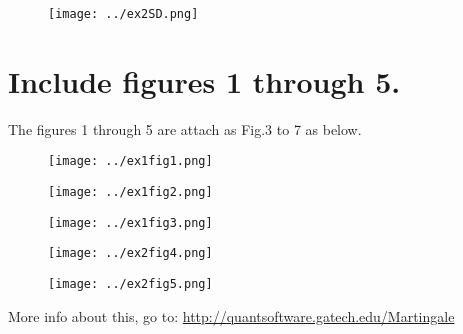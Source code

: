 \documentclass{svproc}
\begin{document}
\begin{figure}[ht!]
    \centering
            \centering
        \texttt{[image: ../ex2SD.png]}
                \label{fig2}
\end{figure}

\section{Include figures 1 through 5.}\label{sec7}
The figures 1 through 5 are attach as Fig.3 to 7 as below.
\begin{figure}[ht!]
    \centering
            \centering
        \texttt{[image: ../ex1fig1.png]}
                \label{fig3}
\end{figure}

\begin{figure}[ht!]
    \centering
            \centering
        \texttt{[image: ../ex1fig2.png]}
                \label{fig4}
\end{figure}

\begin{figure}[ht!]
    \centering
            \centering
        \texttt{[image: ../ex1fig3.png]}
                \label{fig5}
\end{figure}

\begin{figure}[ht!]
    \centering
            \centering
        \texttt{[image: ../ex2fig4.png]}
                \label{fig6}
\end{figure}

\begin{figure}[ht!]
    \centering
            \centering
        \texttt{[image: ../ex2fig5.png]}
                \label{fig7}
\end{figure}
\newpage
More info about this, go to: \url{http://quantsoftware.gatech.edu/Martingale}
\end{document}
